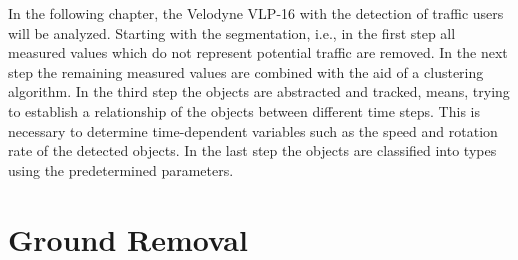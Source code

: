 \documentclass[11pt,oneside,openright]{mpreport}
\begin{document}
In the following chapter, the Velodyne VLP-16 with the detection of traffic users will be analyzed. Starting with the segmentation,
i.e., in the first step all measured values which do not represent potential traffic are removed. 
In the next step the remaining measured values are combined with the aid of a clustering algorithm. 
In the third step the objects are abstracted and tracked, means, trying to establish a relationship of the objects between different time steps.
This is necessary to determine time-dependent variables such as the speed and rotation rate of the detected objects.
In the last step the objects are classified into types using the predetermined parameters.



\section{Ground Removal}
\end{document}
